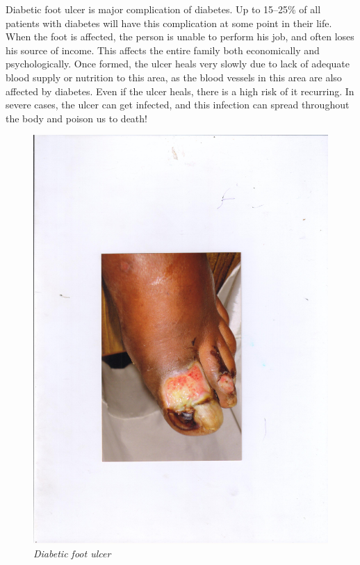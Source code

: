 {

Diabetic foot ulcer is major complication of diabetes. Up to 15–25\% of all patients with diabetes will have this complication at some point in their life. When the foot is affected, the person is unable to perform his job, and often loses his source of income. This affects the entire family both economically and psychologically. Once formed, the ulcer heals very slowly due to lack of adequate blood supply or nutrition to this area, as the blood vessels in this area are also affected by diabetes. Even if the ulcer heals, there is a high risk of it recurring.  In severe cases, the ulcer can get infected, and this infection can spread throughout the body and poison us to death!

\begin{figure}
\includegraphics{images/058.jpg}
\caption{\textit{Diabetic foot ulcer}}
\end{figure}


}
